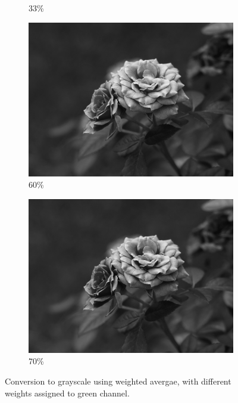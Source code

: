 \documentclass[a4paper]{article}
\begin{document}
\begin{figure}[H]
\begin{subfigure}[b]{.225\textwidth}
        \caption{33\%}
    \end{subfigure}
    \hfill
    \begin{subfigure}[b]{.225\textwidth}
        \centering
        \includegraphics[width=\textwidth]{output/rose_grayscale_60.jpg}
        \caption{60\%}
    \end{subfigure}
    \hfill
    \begin{subfigure}[b]{.225\textwidth}
        \centering
        \includegraphics[width=\textwidth]{output/rose_grayscale_70.jpg}
        \caption{70\%}
    \end{subfigure}
    \hfill
    \caption{Conversion to grayscale using weighted avergae, with different weights assigned to green channel.}
    \label{fig:grayscale}
\end{figure}
\end{document}
